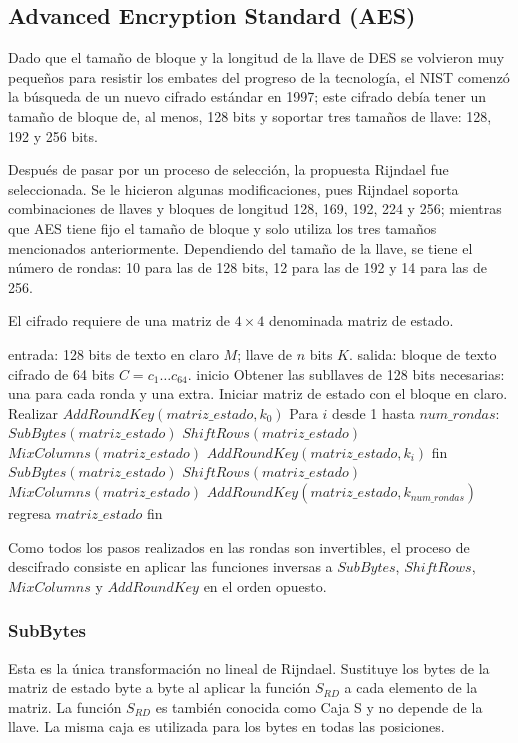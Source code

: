 \subsection{Advanced Encryption Standard (AES)}

Dado que el tamaño de bloque y la longitud de la llave de DES
se volvieron muy pequeños para resistir los embates del progreso
de la tecnología, el NIST comenzó la búsqueda de un nuevo cifrado
estándar en 1997; este cifrado debía tener un tamaño de bloque de,
al menos, 128 bits y soportar tres tamaños de llave: 128, 192 y 256 bits.

Después de pasar por un proceso de selección, la propuesta Rijndael fue
seleccionada. Se le hicieron algunas modificaciones, pues Rijndael soporta
combinaciones de llaves y bloques de longitud 128, 169, 192, 224 y 256;
mientras que AES tiene fijo el tamaño de bloque y solo utiliza los tres
tamaños mencionados anteriormente. Dependiendo del tamaño de la llave, se
tiene el número de rondas: 10 para las de 128 bits, 12 para las de 192 y 14 para las de 256.

El cifrado requiere de una matriz de $4 \times 4$ denominada matriz de
estado.

\begin{pseudocodigo}[caption={AES, cifrado.}, label={aes:1}]
  entrada:    128 bits de texto en claro $M$; llave de $n$ bits $K$.
  salida:     bloque de texto cifrado de 64 bits $C = c_1 \dots c_{64}$.
  inicio
  Obtener las subllaves de 128 bits necesarias: una para
    cada ronda y una extra.
  Iniciar matriz de estado con el bloque en claro.
  Realizar $AddRoundKey(matriz\_estado, k_0)$
  Para $i$ desde 1 hasta $num\_rondas$:
  	$SubBytes(matriz\_estado)$
  	$ShiftRows(matriz\_estado)$
  	$MixColumns(matriz\_estado)$
  	$AddRoundKey(matriz\_estado, k_i)$
  fin
  $SubBytes(matriz\_estado)$
  $ShiftRows(matriz\_estado)$
  $MixColumns(matriz\_estado)$
  $AddRoundKey(matriz\_estado, k_{num\_rondas})$
  regresa $matriz\_estado$
  fin
\end{pseudocodigo}

Como todos los pasos realizados en las rondas son invertibles, el
proceso de descifrado consiste en aplicar las funciones inversas a
$SubBytes$, $ShiftRows$, $MixColumns$ y $AddRoundKey$ en el orden
opuesto.

\subsubsection{SubBytes}
Esta es la única transformación no lineal de Rijndael. Sustituye
los bytes de la matriz de estado byte a byte al aplicar la función
$S_{RD}$ a cada elemento de la matriz. La función $S_{RD}$ es también
conocida como Caja S y no depende de la llave. La misma caja es utilizada
para los bytes en todas las posiciones.

